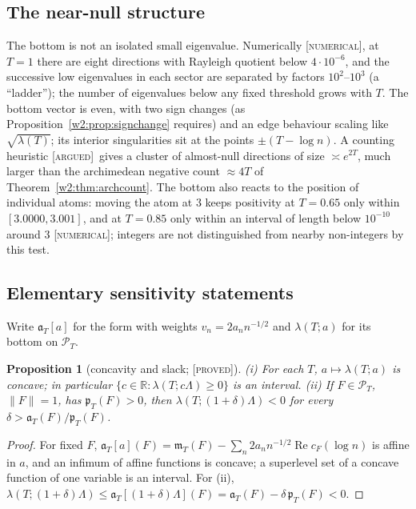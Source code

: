 \documentclass[11pt]{amsart}
\newtheorem{proposition}[theorem]{Proposition}
\theoremstyle{definition}
\theoremstyle{remark}
\numberwithin{equation}{section}
\newcommand{\R}{\mathbb{R}}
\DeclareMathOperator{\Rel}{Re}
\newcommand{\cF}{c_F}                                  %
\newcommand{\PT}{\mathcal{P}_T}                        %
\newcommand{\mT}{\mathfrak{m}_T}                       %
\newcommand{\pT}{\mathfrak{p}_T}                       %
\newcommand{\aT}{\mathfrak{a}_T}                       %
\newcommand{\lam}{\lambda(T)}                          %
\newcommand{\stag}[1]{\textsc{[#1]}}
\newcommand{\PROVED}{\stag{proved}}
\newcommand{\ARGUED}{\stag{argued}}
\newcommand{\NUM}{\stag{numerical}}
\begin{document}
\subsection{The near-null structure}

The bottom is not an isolated small eigenvalue. Numerically \NUM, at $T=1$ there are eight directions with Rayleigh
quotient below $4\cdot10^{-6}$, and the successive low eigenvalues in each sector are separated by factors $10^2$--$10^3$
(a ``ladder''); the number of eigenvalues below any fixed threshold grows with $T$. The bottom vector is even, with two
sign changes (as Proposition~\ref{w2:prop:signchange} requires) and an edge behaviour scaling like $\sqrt{\lam}$; its
interior singularities sit at the points $\pm(T-\log n)$. A counting heuristic \ARGUED\ gives a cluster of almost-null
directions of size $\asymp e^{2T}$, much larger than the archimedean negative count $\approx4T$ of
Theorem~\ref{w2:thm:archcount}. The bottom also reacts to the position of individual atoms: moving the atom at $3$
keeps positivity at $T=0.65$ only within $[3.0000,3.001]$, and at $T=0.85$ only within an interval of length below
$10^{-10}$ around $3$ \NUM; integers are not distinguished from nearby non-integers by this test.

\subsection{Elementary sensitivity statements}

Write $\aT[a]$ for the form with weights $v_n=2a_nn^{-1/2}$ and $\lambda(T;a)$ for its bottom on $\PT$.

\begin{proposition}[concavity and slack; \PROVED]\label{w2:prop:concave}
\emph{(i)} For each $T$, $a\mapsto\lambda(T;a)$ is concave; in particular $\{c\in\R:\lambda(T;c\Lambda)\ge0\}$ is an
interval.
\emph{(ii)} If $F\in\PT$, $\|F\|=1$, has $\pT(F)>0$, then $\lambda(T;(1+\delta)\Lambda)<0$ for every
$\delta>\aT(F)/\pT(F)$.
\end{proposition}

\begin{proof}
For fixed $F$, $\aT[a](F)=\mT(F)-\sum_n2a_nn^{-1/2}\Rel\cF(\log n)$ is affine in $a$, and an infimum of affine functions
is concave; a superlevel set of a concave function of one variable is an interval. For (ii),
$\lambda(T;(1+\delta)\Lambda)\le\aT[(1+\delta)\Lambda](F)=\aT(F)-\delta\,\pT(F)<0$.
\end{proof}
\end{document}
